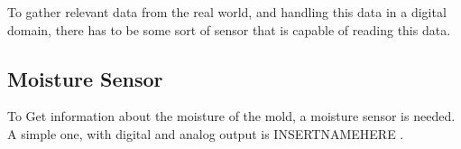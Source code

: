 To gather relevant data from the real world, and handling this data in a digital domain, there has to be some sort of sensor that is capable of reading this data.

\subsection{Moisture Sensor}
To Get information about the moisture of the mold, a moisture sensor is needed. A simple one, with digital and analog output is INSERTNAMEHERE .

